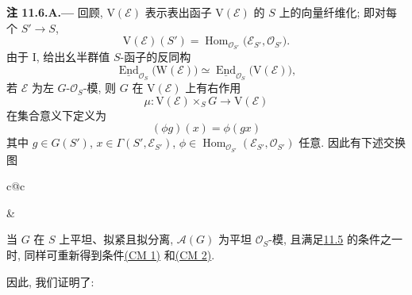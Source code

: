 \medskip
{}\label{rem:sga3-VIB-11.6.A}%
\noindent\textbf{注 11.6.A.---}
回顾, \(\mathrm V(\mathcal E)\) 表示表出函子
\(\mathrm V(\mathcal E)\) 的 \(S\) 上的向量纤维化;
即对每个 \(S'\to S\),
\[
  \mathrm V(\mathcal E)(S')
  =
  \operatorname{Hom}_{\mathcal O_{S'}}
    \bigl(\mathcal E_{S'},\mathcal O_{S'}\bigr).
\]
由于 I, 
给出幺半群值 \(S\)-函子的反同构
\[
  \underline{\operatorname{End}}_{\mathcal O_S}
    \bigl(\mathrm W(\mathcal E)\bigr)
  \simeq
  \underline{\operatorname{End}}_{\mathcal O_S}
    \bigl(\mathrm V(\mathcal E)\bigr),
\]
若 \(\mathcal E\) 为左 \(G\)-\(\mathcal O_S\)-模,
则 \(G\) 在 \(\mathrm V(\mathcal E)\) 上有右作用
\[
  \mu:\mathrm V(\mathcal E)\times_SG
    \longrightarrow\mathrm V(\mathcal E)
\]
在集合意义下定义为
\[
  (\phi g)(x)=\phi(gx)
\]
其中 \(g\in G(S')\), \(x\in\Gamma(S',\mathcal E_{S'})\),
\(\phi\in
  \operatorname{Hom}_{\mathcal O_{S'}}
    (\mathcal E_{S'},\mathcal O_{S'})\) 任意.
因此有下述交换图
\begin{center}
  \label{diag:sga3-VIB-11.6.A-actions}%
  {\small
  \begin{tabular}{c@{\qquad}c}
    &
  \end{tabular}}
\end{center}
当 \(G\) 在 \(S\) 上平坦、拟紧且拟分离,
\(\mathcal A(G)\) 为平坦 \(\mathcal O_S\)-模,
且满足\hyperref[prop:sga3-VIB-11.5]{11.5} 的条件之一时,
同样可重新得到条件\hyperref[cond:sga3-VIB-11.6-CM1]{\textup{(CM 1)}}
和\hyperref[cond:sga3-VIB-11.6-CM2]{\textup{(CM 2)}}.

因此, 我们证明了:

